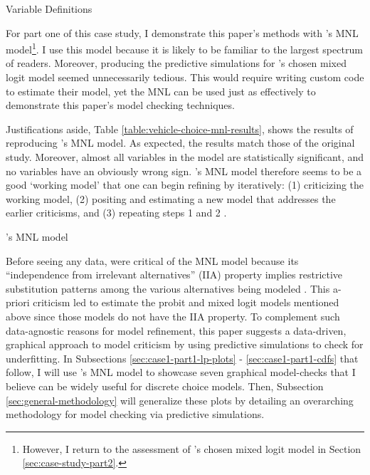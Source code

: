 \documentclass[preprint]{elsarticle}
\begin{document}
\begin{table}
\centering

\caption{Variable Definitions}
\label{table:variable-definitions-vehicle-choice}
\end{table}

For part one of this case study, I demonstrate this paper's methods with \citeauthor{brownstone_forecasting_1998}'s MNL model\footnote{However, I return to the assessment of \citeauthor{brownstone_forecasting_1998}'s chosen mixed logit model in Section \ref{sec:case-study-part2}.}. I use this model because it is likely to be familiar to the largest spectrum of readers. Moreover, producing the predictive simulations for \citeauthor{brownstone_forecasting_1998}'s chosen mixed logit model seemed unnecessarily tedious. This would require writing custom code to estimate their model, yet the MNL can be used just as effectively to demonstrate this paper's model checking techniques. 

Justifications aside, Table \ref{table:vehicle-choice-mnl-results}, shows the results of reproducing \citeauthor{brownstone_forecasting_1998}'s MNL model. As expected, the results match those of the original study. Moreover, almost all variables in the model are statistically significant, and no variables have an obviously wrong sign. \citeauthor{brownstone_forecasting_1998}'s MNL model therefore seems to be a good `working model' that one can begin refining by iteratively: (1) criticizing the working model, (2) positing and estimating a new model that addresses the earlier criticisms, and (3) repeating steps 1 and 2 \citep[p.795]{box_science_1976}.

\begin{table}
\centering

\caption{\citeauthor{brownstone_forecasting_1998}'s MNL model}
\label{table:vehicle-choice-mnl-results}
\end{table}

Before seeing any data, \citeauthor{brownstone_forecasting_1998} were critical of the MNL model because its ``independence from irrelevant alternatives'' (IIA) property implies restrictive substitution patterns among the various alternatives being modeled \citep[pp.109-110]{brownstone_forecasting_1998}. This a-priori criticism led \citeauthor{brownstone_forecasting_1998} to estimate the probit and mixed logit models mentioned above since those models do not have the IIA property. To complement such data-agnostic reasons for model refinement, this paper suggests a data-driven, graphical approach to model criticism by using predictive simulations to check for underfitting. In Subsections \ref{sec:case1-part1-lp-plots} - \ref{sec:case1-part1-cdfs} that follow, I will use  \citeauthor{brownstone_forecasting_1998}'s MNL model to showcase seven graphical model-checks that I believe can be widely useful for discrete choice models. Then, Subsection \ref{sec:general-methodology} will generalize these plots by detailing an overarching methodology for model checking via predictive simulations.
\end{document}
